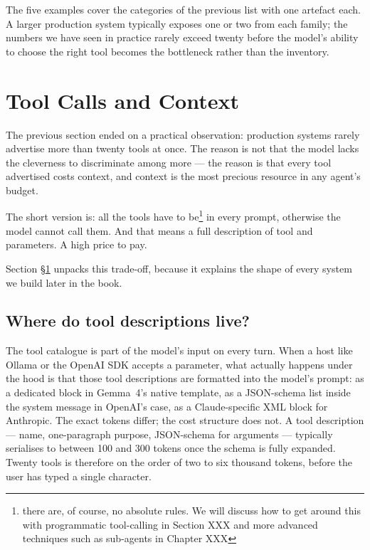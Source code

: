 The five examples cover the categories of the previous list with one
artefact each. A larger production system typically exposes one or
two from each family; the numbers we have seen in practice rarely
exceed twenty before the model's ability to choose the right tool
becomes the bottleneck rather than the inventory.

\section{Tool Calls and Context}
\label{sec:context}

The previous section ended on a practical observation: production
systems rarely advertise more than twenty tools at once. The reason
is not that the model lacks the cleverness to discriminate among
more --- the reason is that every tool advertised costs context, and
context is the most precious resource in any agent's budget. 

The short version is: all the tools have to be\footnote{there are, of course, 
no absolute rules. We will discuss how to get around this with programmatic
tool-calling in Section XXX and more advanced techniques such as sub-agents in Chapter XXX}
in every prompt, otherwise the model cannot call them. And that means a full
description of tool and parameters. A high price to pay.

Section
\S\ref{sec:context} unpacks this trade-off, because it explains the
shape of every system we build later in the book.

\subsection{Where do tool descriptions live?}
\label{sec:context-prompt}

The tool catalogue is part of the model's input on every turn. When
a host like Ollama or the OpenAI SDK accepts a 
parameter, what actually happens under the hood is that those tool
descriptions are formatted into the model's prompt: as a dedicated
 block in Gemma~4's native template,
as a JSON-schema list inside the system message in OpenAI's case,
as a Claude-specific XML block for Anthropic. The exact tokens
differ; the cost structure does not. A tool description --- name,
one-paragraph purpose, JSON-schema for arguments --- typically
serialises to between 100 and 300 tokens once the schema is
fully expanded. Twenty tools is therefore on the order of two to
six thousand tokens, before the user has typed a single character.

